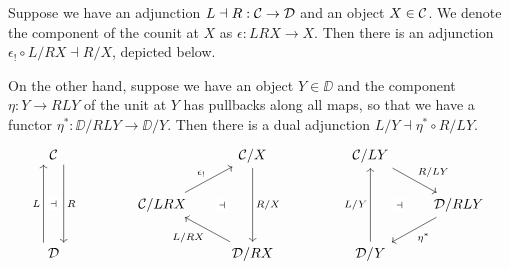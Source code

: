 \begin{lemma} \label{lem:adjoints-of-slice-functors}
  Suppose we have an adjunction $L \dashv R : \mathcal{C} \to \mathcal{D}$
  and an object $X \in \mathcal{C}$.
  We denote the component of the counit at $X$ as
  $\epsilon : L R X \to X$.
  Then there is an adjunction $\epsilon_! \circ L / R X \dashv R / X$,
  depicted below.

  On the other hand, suppose we have an object $Y \in \DD$
  and the component $\eta : Y \to R L Y$ of the unit at $Y$
  has pullbacks along all maps,
  so that we have a functor $\eta^* : \DD / R L Y \to \DD / Y$.
  Then there is a dual adjunction $L / Y \dashv \eta^* \circ R / L Y$.
  \[ \begin{tikzcd}
    \CC &&& {\CC / X} && {\CC / L Y} \\
    && {\CC / L R X} &&&& {\DD / R L Y} \\
    \DD &&& {\DD / R X} && {\DD / Y}
    \arrow[""{name=0, anchor=center, inner sep=0}, "R", shift left=3, from=1-1, to=3-1]
    \arrow[""{name=1, anchor=center, inner sep=0}, "{{R / X}}", from=1-4, to=3-4]
    \arrow["{R / L Y}", from=1-6, to=2-7]
    \arrow["{{\epsilon_!}}", from=2-3, to=1-4]
    \arrow["{\eta^*}", from=2-7, to=3-6]
    \arrow[""{name=2, anchor=center, inner sep=0}, "L", shift left=3, from=3-1, to=1-1]
    \arrow["{{L / R X}}", from=3-4, to=2-3]
    \arrow[""{name=3, anchor=center, inner sep=0}, "{L / Y}", from=3-6, to=1-6]
    \arrow["\dashv"{description}, draw=none, from=2-3, to=1]
    \arrow["\dashv"{description}, draw=none, from=2, to=0]
    \arrow["\dashv"{description}, draw=none, from=3, to=2-7]
  \end{tikzcd} \]
\end{lemma}
